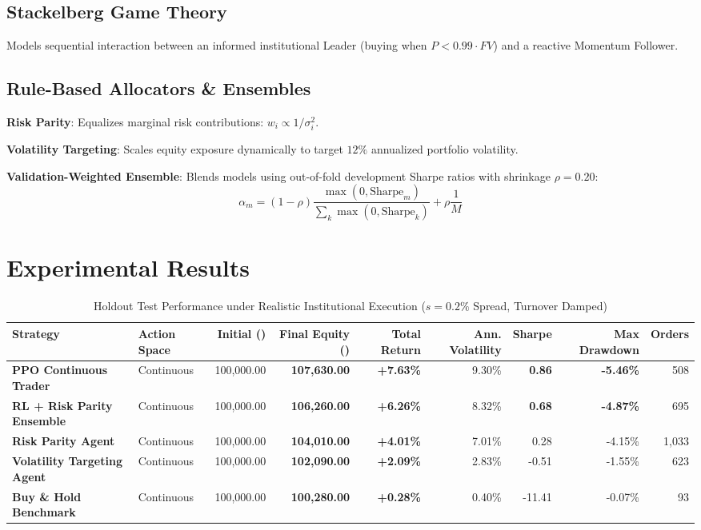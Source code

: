 \documentclass[10pt,journal,compsoc]{IEEEtran}
\begin{document}
\subsection{Stackelberg Game Theory}
Models sequential interaction between an informed institutional Leader (buying when $P < 0.99 \cdot FV$) and a reactive Momentum Follower.

\subsection{Rule-Based Allocators \& Ensembles}
\textbf{Risk Parity}: Equalizes marginal risk contributions: $w_i \propto 1/\sigma_i^2$.

\textbf{Volatility Targeting}: Scales equity exposure dynamically to target $12\%$ annualized portfolio volatility.

\textbf{Validation-Weighted Ensemble}: Blends models using out-of-fold development Sharpe ratios with shrinkage $\rho = 0.20$:
\begin{equation}
\alpha_m = (1 - \rho) \frac{\max(0, \text{Sharpe}_m)}{\sum_k \max(0, \text{Sharpe}_k)} + \rho \frac{1}{M}
\end{equation}

\section{Experimental Results}

\begin{table}[t]
\centering
\caption{Holdout Test Performance under Realistic Institutional Execution ($s=0.2\%$ Spread, Turnover Damped)}
\label{tab:results}
\begin{tabular}{llrrrrrrr}
\toprule
Strategy & Action Space & Initial (\text{\rupee}) & Final Equity (\text{\rupee}) & Total Return & Ann. Volatility & Sharpe & Max Drawdown & Orders \\
\midrule
\textbf{PPO Continuous Trader} & Continuous & 100,000.00 & \textbf{107,630.00} & \textbf{+7.63\%} & 9.30\% & \textbf{0.86} & \textbf{-5.46\%} & 508 \\
\textbf{RL + Risk Parity Ensemble} & Continuous & 100,000.00 & \textbf{106,260.00} & \textbf{+6.26\%} & 8.32\% & \textbf{0.68} & \textbf{-4.87\%} & 695 \\
\textbf{Risk Parity Agent} & Continuous & 100,000.00 & \textbf{104,010.00} & \textbf{+4.01\%} & 7.01\% & 0.28 & -4.15\% & 1,033 \\
\textbf{Volatility Targeting Agent} & Continuous & 100,000.00 & \textbf{102,090.00} & \textbf{+2.09\%} & 2.83\% & -0.51 & -1.55\% & 623 \\
\textbf{Buy \& Hold Benchmark} & Continuous & 100,000.00 & \textbf{100,280.00} & \textbf{+0.28\%} & 0.40\% & -11.41 & -0.07\% & 93 \\
\bottomrule
\end{tabular}
\end{table}
\end{document}

